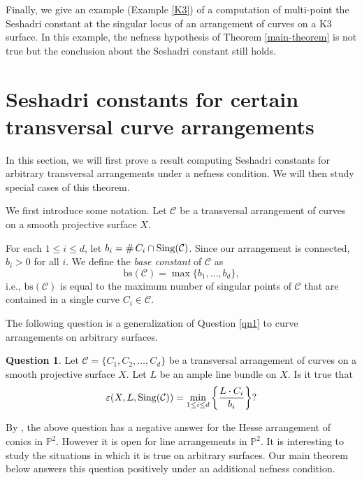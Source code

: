 \documentclass[12pt,reqno]{amsart}
\theoremstyle{plain}
\numberwithin{equation}{section}
\theoremstyle{definition}
\newtheorem{question}[theorem]{Question}
\newtheorem{definition}[theorem]{Definition}
\begin{document}
Finally, we give an example (Example \ref{K3}) of a computation of multi-point the Seshadri constant at the singular locus of an arrangement of curves on a K3 surface. In this example, the nefness hypothesis of Theorem \ref{main-theorem} is not true but the conclusion about the Seshadri constant still holds. 
	
	\section{Seshadri constants for certain transversal curve arrangements}\label{main}	

In this section, we will first prove a result computing Seshadri constants for arbitrary transversal arrangements under a nefness condition. We will then study special cases of this theorem. 


We first introduce some notation. 
		Let $\mathcal{C}$ be a transversal arrangement of curves on a smooth projective surface $X$. 
  
  For each $1\le i \le d$, let $b_i =  \# \, C_{i} \cap {\rm Sing}(\mathcal{C})$. Since our arrangement is connected, $b_i >0$ for all $i$.
   We define the \emph{base constant} of $\mathcal{C}$ as 
   $$\text{bs}(\mathcal{C}) = \max\{b_1,\dots, b_d\},$$ i.e., 
$\text{bs}(\mathcal{C})$		
  is equal to the maximum number of singular points  of $\mathcal{C}$ that are contained in a single curve $C_{i} \in \mathcal{C}$.
 

The following question is a generalization of Question \ref{qn1} to curve arrangements on arbitrary surfaces. 


	\begin{question}\label{question}
		Let $\mathcal{C} =\{C_1,C_2, \ldots ,C_d\}$ be a transversal arrangement of curves on a smooth projective surface $X$. Let $L$ be an ample line bundle on $X$. Is it true that
		\begin{equation*}
  \varepsilon(X, L,{\rm Sing}(\mathcal{C})) =  \min_{1\le i \le d}\left\{\frac{L\cdot C_i}{b_i}\right\}?
		\end{equation*}
	\end{question}


By \cite[Example 3.5]{JP}, the above question has a negative answer for the Hesse arrangement of conics 
in $\mathbb{P}^2$. However it is open for line arrangements in $\mathbb{P}^2$. 
It is interesting to study the situations in which it is true on arbitrary surfaces. Our main theorem below answers this question positively under an additional nefness condition. 
\end{document}
